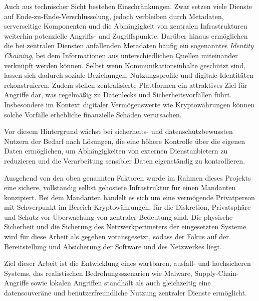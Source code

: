 Auch aus technischer Sicht bestehen Einschränkungen. Zwar setzen viele Dienste auf Ende-zu-Ende-Verschlüsselung, jedoch verbleiben durch Metadaten, serverseitige Komponenten und die Abhängigkeit von zentralen Infrastrukturen weiterhin potenzielle Angriffs- und Zugriffspunkte.\cite{landau_metadata_2020} Darüber hinaus ermöglichen die bei zentralen Diensten anfallenden Metadaten häufig ein sogenanntes \textit{Identity Chaining}, bei dem Informationen aus unterschiedlichen Quellen miteinander verknüpft werden können.\cite{landau_metadata_2020,gao_identity_linkage_2022} Selbst wenn Kommunikationsinhalte geschützt sind, lassen sich dadurch soziale Beziehungen, Nutzungsprofile und digitale Identitäten rekonstruieren. Zudem stellen zentralisierte Plattformen ein attraktives Ziel für Angriffe dar, was regelmäßig zu Datenlecks und Sicherheitsvorfällen führt.\cite{verizon_dbir_2025} Insbesondere im Kontext digitaler Vermögenswerte wie Kryptowährungen können solche Vorfälle erhebliche finanzielle Schäden verursachen.\cite{chainalysis_crypto_theft_2025}

Vor diesem Hintergrund wächst bei sicherheits- und datenschutzbewussten Nutzern der Bedarf nach Lösungen, die eine höhere Kontrolle über die eigenen Daten ermöglichen, um Abhängigkeiten von externen Dienstanbietern zu reduzieren und die Verarbeitung sensibler Daten eigenständig zu kontrollieren.

Ausgehend von den oben genannten Faktoren wurde im Rahmen dieses Projekts eine sichere, vollständig selbst gehostete Infrastruktur für einen Mandanten konzipiert. Bei dem Mandanten handelt es sich um eine vermögende Privatperson mit Schwerpunkt im Bereich Kryptowährungen, für die Diskretion, Privatsphäre und Schutz vor Überwachung von zentraler Bedeutung sind. Die physische Sicherheit und die Sicherung des Netzwerkperimeters der eingesetzten Systeme wird für diese Arbeit als gegeben vorausgesetzt, sodass der Fokus auf der Bereitstellung und Absicherung der Software und des Netzwerkes liegt.

Ziel dieser Arbeit ist die Entwicklung eines wartbaren, ausfall- und hochsicheren Systems, das realistischen Bedrohungsszenarien wie Malware, Supply-Chain-Angriffe sowie lokalen Angriffen standhält als auch gleichzeitig eine datensouveräne und benutzerfreundliche Nutzung zentraler Dienste ermöglicht. 

